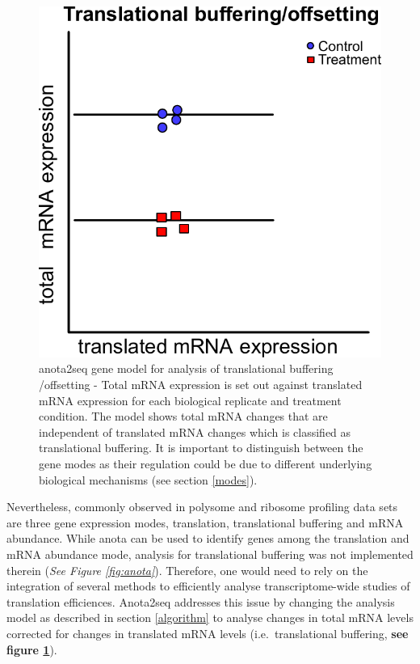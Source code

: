 \documentclass[
  12pt,
  openany]{book}
\begin{document}
\begin{figure}
  \includegraphics{./figures/geneModes_anota2seq.pdf}
  \caption{anota2seq gene model for analysis of translational buffering /offsetting - Total mRNA expression is set out against translated mRNA expression for each biological replicate and treatment condition. The model shows total mRNA changes that are independent of translated mRNA changes which is classified as translational buffering. It is important to distinguish between the gene modes as their regulation could be due to different underlying biological mechanisms (see section \ref{modes}).
  \label{fig:anota2seq}}
\end{figure}

Nevertheless, commonly observed in polysome and ribosome profiling data sets are three gene expression modes, translation, translational buffering and mRNA abundance. While anota can be used to identify genes among the translation and mRNA abundance mode, analysis for translational buffering was not implemented therein (\emph{See Figure \ref{fig:anota}}). Therefore, one would need to rely on the integration of several methods to efficiently analyse transcriptome-wide studies of translation efficiences. Anota2seq addresses this issue by changing the analysis model as described in section \ref{algorithm} to analyse changes in total mRNA levels corrected for changes in translated mRNA levels (i.e.~translational buffering, \textbf{see figure \ref{fig:anota2seq}}).
\end{document}
